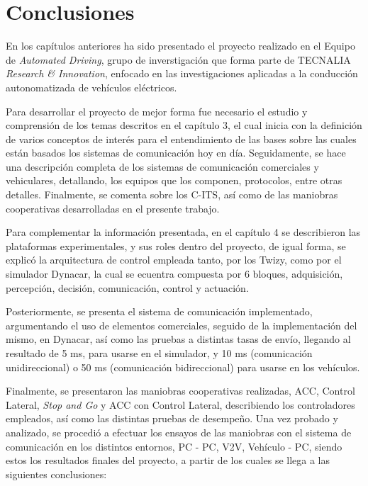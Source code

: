 \chapter{Conclusiones}
\thispagestyle{empty}

En los capítulos anteriores ha sido presentado el proyecto realizado en el Equipo de \textit{Automated Driving}, grupo de inverstigación que forma parte de TECNALIA \textit{Research \& Innovation}, enfocado en las investigaciones aplicadas a la conducción autonomatizada de vehículos eléctricos.\\

\par Para desarrollar el proyecto de mejor forma fue necesario el estudio y comprensión de los temas descritos en el capítulo 3, el cual inicia con la definición de varios conceptos de interés para el entendimiento de las bases sobre las cuales están basados los sistemas de comunicación hoy en día. Seguidamente, se hace una descripción completa de los sistemas de comunicación comerciales y vehiculares, detallando, los equipos que los componen, protocolos, entre otras detalles. Finalmente, se comenta sobre los C-ITS, así como de las maniobras cooperativas desarrolladas en el presente trabajo.\\

\par Para complementar la información presentada, en el capítulo 4 se describieron las plataformas experimentales, y sus roles dentro del proyecto, de igual forma, se explicó la arquitectura de control empleada tanto, por los Twizy, como por el simulador Dynacar, la cual se ecuentra compuesta por 6 bloques, adquisición, percepción, decisión, comunicación, control y actuación.\\

\par Posteriormente, se presenta el sistema de comunicación implementado, argumentando el uso de elementos comerciales, seguido de la implementación del mismo, en Dynacar, así como las pruebas a distintas tasas de envío, llegando al resultado de 5 ms, para usarse en el simulador, y 10 ms (comunicación unidireccional) o 50 ms (comunicación bidireccional) para usarse en los vehículos.\\

\par Finalmente, se presentaron las maniobras cooperativas realizadas, ACC, Control Lateral, \textit{Stop and Go} y ACC con Control Lateral, describiendo los controladores empleados, así como las distintas pruebas de desempeño. Una vez probado y analizado, se procedió a efectuar los ensayos de las maniobras con el sistema de comunicación en los distintos entornos, PC - PC, V2V, Vehículo - PC, siendo estos los resultados finales del proyecto, a partir de los cuales se llega a las siguientes conclusiones:
    

